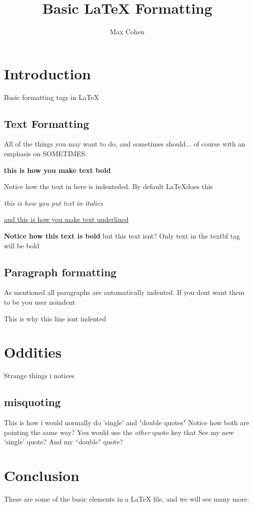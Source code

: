 \documentclass{article}
\title{Basic \LaTeX{} Formatting}
\author{Max Cohen}
\begin{document}
\maketitle

\section{Introduction}
Basic formatting tags in \LaTeX

\subsection{Text Formatting}

All of the things you may want to do, and sometimes should... of course with an emphasis on SOMETIMES.

\textbf{this is how you make text bold}

Notice how the text in here is indenteded. By default \LaTeX does this

\emph{this is how you put text in italics}

\underline{and this is how you make text underlined}

\textbf{Notice how this text is bold} but this text isnt? Only text in the textbf tag will be bold


\subsection{Paragraph formatting}

As mentioned all paragraphs are automatically indented. If you dont want them to be you user noindent

\noindent This is why this line isnt indented

\section{Oddities}
Strange things i notices

\subsection{misquoting}
This is how i would normally do 'single' and "double quotes"
\noindent Notice how both are pointing the same way?
\noindent You would use the \emph{other} quote key that
\noindent See my new `single' quote? And my ``double" quote?

\section{Conclusion}
These are some of the basic elements in a \LaTeX{} file, and we will see many more.
\end{document}
